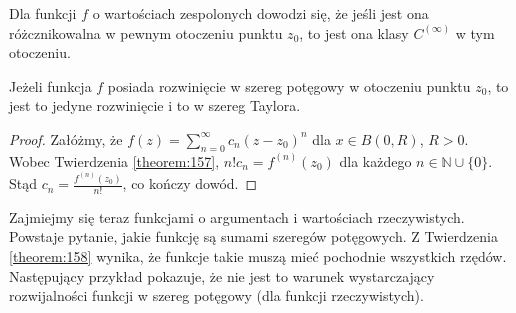 \documentclass[leqno]{article}
\begin{document}
\begin{justify}
\begin{defn}
    Dla funkcji $f$ o wartościach zespolonych dowodzi się, że jeśli jest ona różcznikowalna w pewnym otoczeniu punktu $z_0$, to jest ona klasy 
    $C^{(\infty)}$ w tym otoczeniu.
\end{defn}

\begin{theorem}
{
    Jeżeli funkcja $f$ posiada rozwinięcie w szereg potęgowy w otoczeniu punktu $z_0$, to jest to jedyne rozwinięcie i to w szereg Taylora.
}
\end{theorem}

\begin{proof}
    Załóżmy, że $f(z) = \sum\limits_{n=0}^{\infty}c_n {(z-z_0)}^n$ dla $x \in B(0, R)$, $R > 0$. Wobec 
    Twierdzenia \ref{theorem:157}, $n!c_n = f^{(n)}(z_0)$ dla każdego $n \in \mathbb{N} \cup \{0\}$. Stąd
    $c_n = \frac{f^{(n)}(z_0)}{n!}$, co kończy dowód.
\end{proof}

Zajmiejmy się teraz funkcjami o argumentach i wartościach rzeczywistych. Powstaje pytanie, jakie funkcję są sumami szeregów potęgowych.
Z Twierdzenia \ref{theorem:158} wynika, że funkcje takie muszą mieć pochodnie wszystkich rzędów. Następujący przykład pokazuje, że nie jest to 
warunek wystarczający rozwijalności funkcji w szereg potęgowy (dla funkcji rzeczywistych).


\end{justify}
\end{document}
